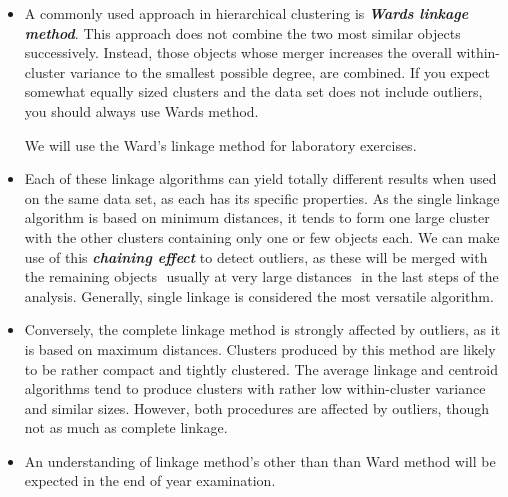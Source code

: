 \documentclass[a4paper,12pt]{article}
\begin{document}
\begin{itemize}

\item A commonly used approach in hierarchical clustering is \textbf{\textit{Wards linkage method}}.
This approach does not combine the two most similar objects successively. Instead,
those objects whose merger increases the overall within-cluster variance to the
smallest possible degree, are combined. If you expect somewhat equally sized
clusters and the data set does not include outliers, you should always use Wards
method.

We will use the Ward's linkage method for laboratory exercises.



\item Each of these linkage algorithms can yield totally different results when used on the same data set, as each has its specific properties. As the single linkage algorithm is based on minimum distances, it tends to form one large cluster with the other clusters containing only one or few objects each. We can make use of this \textbf{\textit{chaining effect}} to detect outliers, as these will be merged with the remaining objects  usually at very large distances  in the last steps of the analysis. Generally, single linkage is considered the most versatile algorithm.
\item 
Conversely, the complete linkage method is strongly affected by outliers, as it is based on maximum distances. Clusters produced by this method are likely to be rather compact and tightly clustered. The average linkage and centroid algorithms tend to produce clusters with rather low within-cluster variance and similar sizes.
However, both procedures are affected by outliers, though not as much as complete linkage.

\item An understanding of linkage method's other than than Ward method will be expected in the end of year examination.
\end{itemize}




\end{document}
